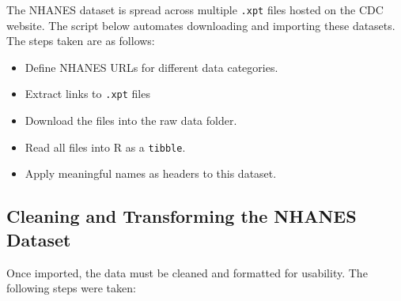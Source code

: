 \documentclass[
]{article}
\providecommand{\tightlist}{%
  \setlength{\itemsep}{0pt}\setlength{\parskip}{0pt}}
\begin{document}
The NHANES dataset is spread across multiple \texttt{.xpt} files hosted
on the CDC website. The script below automates downloading and importing
these datasets. The steps taken are as follows:

\begin{itemize}
\tightlist
\item
  Define NHANES URLs for different data categories.
\item
  Extract links to \texttt{.xpt} files
\item
  Download the files into the raw data folder.
\item
  Read all files into R as a \texttt{tibble}.
\item
  Apply meaningful names as headers to this dataset.
\end{itemize}

\subsection{Cleaning and Transforming the NHANES
Dataset}\label{cleaning-and-transforming-the-nhanes-dataset}

Once imported, the data must be cleaned and formatted for usability. The
following steps were taken:
\end{document}
